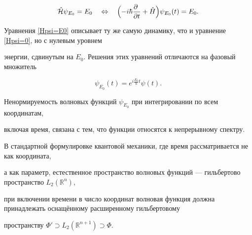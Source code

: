 \begin{equation}\label{Hpsi=E0}

  \mathcal{\hat H}\psi_{E_0}=E_0\quad\Leftrightarrow\quad

  \Bigl(-i\hbar\frac{\partial~}{\partial t}+\hat H\Bigr)\psi_{E_0}(t)=E_0.

\end{equation}

  Уравнения \eqref{Hpsi=E0} описывает ту же самую динамику, что и уравнение \eqref{Hpsi=0}, но с нулевым уровнем

  энергии, сдвинутым на $E_0$. Решения этих уравнений отличаются на фазовый множитель

\begin{equation}\label{psi0psiE0}

  \psi_{E_0}(t)=e^{i\frac{E_0}{\hbar}t}\psi(t).

\end{equation}

 Ненормируемость волновых функций $\psi_{E_0}$ при интегрировании по всем координатам,

 включая время, связана с тем, что функции относятся к непрерывному спектру.

 В стандартной формулировке квантовой механики, где время рассматривается не как координата,

 а как параметр, естественное пространство волновых функций --- гильбертово пространство $L_2(\mathbb{R}^n)$,

 при включении времени в число координат волновая функция должна принадлежать оснащённому расширенному гильбертовому

 пространству $\Phi'\supset L_2(\mathbb{R}^{n+1})\supset\Phi$.




\smallskip



